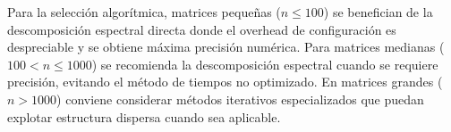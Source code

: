 Para la selección algorítmica, matrices pequeñas ($n \leq 100$) se benefician de la descomposición espectral directa donde el overhead de configuración es despreciable y se obtiene máxima precisión numérica. Para matrices medianas ($100 < n \leq 1000$) se recomienda la descomposición espectral cuando se requiere precisión, evitando el método de tiempos no optimizado. En matrices grandes ($n > 1000$) conviene considerar métodos iterativos especializados que puedan explotar estructura dispersa cuando sea aplicable.